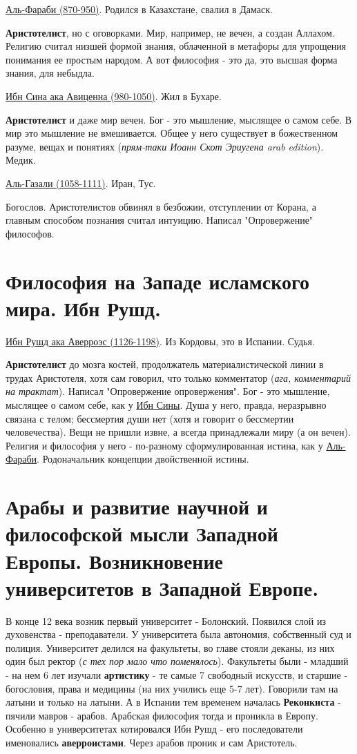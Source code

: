 \underline{Аль-Фараби (870-950)}. Родился в Казахстане, свалил в Дамаск.

\textbf{Аристотелист}, но с оговорками. Мир, например, не вечен, а создан Аллахом. Религию считал низшей формой знания, облаченной в метафоры для упрощения понимания ее простым народом. А вот философия - это да, это высшая форма знания, для небыдла.

\underline{Ибн Сина ака Авиценна (980-1050)}. Жил в Бухаре.


\textbf{Аристотелист} и даже мир вечен. Бог - это мышление, мыслящее о самом себе. В мир это мышление не вмешивается.
Общее у него существует в божественном разуме, вещах и понятиях (\textit{прям-таки Иоанн Скот Эриугена arab edition}). Медик.

\underline{Аль-Газали (1058-1111)}. Иран, Тус.

Богослов. Аристотелистов обвинял в безбожии, отступлении от Корана, а главным способом познания считал интуицию. Написал "Опровержение" философов.

\section{Философия на Западе исламского мира. Ибн Рушд.}
\underline{Ибн Рушд ака Аверроэс (1126-1198)}. Из Кордовы, это в Испании. Судья.

\textbf{Аристотелист} до мозга костей, продолжатель материалистической линии в трудах Аристотеля, хотя сам говорил, что только комментатор (\textit{ага, комментарий на трактат}). Написал "Опровержение опровержения". Бог - это мышление, мыслящее о самом себе, как у \underline{Ибн Сины}. 
%
Душа у него, правда, неразрывно связана с телом; бессмертия души нет (хотя и говорит о бессмертии человечества). 
%
Вещи не пришли извне, а всегда принадлежали миру (а он вечен). Религия и философия у него - по-разному сформулированная истина, как у \underline{Аль-Фараби}. Родоначальник концепции двойственной истины.


\section{Арабы и развитие научной и философской мысли Западной Европы. Возникновение университетов в Западной Европе.}
В конце 12 века возник первый университет - Болонский. Появился слой из духовенства - преподаватели. У университета была автономия, собственный суд и полиция. Университет делился на факультеты, во главе стояли деканы, из них один был ректор (\textit{с тех пор мало что поменялось}). Факультеты были - младший - на нем 6 лет изучали \textbf{артистику} - те самые 7 свободный искусств, и старшие - богословия, права и медицины (на них учились еще 5-7 лет). Говорили там на латыни и только на латыни. 
А в Испании тем временем началась \textbf{Реконкиста} - пячили мавров - арабов. Арабская философия тогда и проникла в Европу. Особенно в университетах котировался Ибн Рушд - его последователи именовались \textbf{аверроистами}. Через арабов проник и сам Аристотель.

